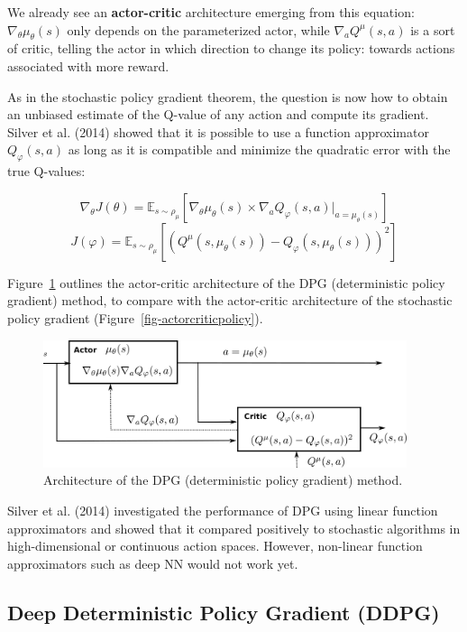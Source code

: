 \documentclass[
  letterpaper,
  DIV=11,
  numbers=noendperiod]{scrreprt}
\begin{document}
We already see an \textbf{actor-critic} architecture emerging from this
equation: \(\nabla_\theta \mu_\theta(s)\) only depends on the
parameterized actor, while \(\nabla_a Q^\mu(s, a)\) is a sort of critic,
telling the actor in which direction to change its policy: towards
actions associated with more reward.

As in the stochastic policy gradient theorem, the question is now how to
obtain an unbiased estimate of the Q-value of any action and compute its
gradient. Silver et al. (2014) showed that it is possible to use a
function approximator \(Q_\varphi(s, a)\) as long as it is compatible
and minimize the quadratic error with the true Q-values:

\[
    \nabla_\theta J(\theta) = \mathbb{E}_{s \sim \rho_\mu}[\nabla_\theta \mu_\theta(s) \times \nabla_a Q_\varphi(s, a) |_{a = \mu_\theta(s)}]
\] \[
    J(\varphi) = \mathbb{E}_{s \sim \rho_\mu}[(Q^\mu(s, \mu_\theta(s)) - Q_\varphi(s, \mu_\theta(s)))^2]
\]

Figure~\ref{fig-dpg} outlines the actor-critic architecture of the DPG
(deterministic policy gradient) method, to compare with the actor-critic
architecture of the stochastic policy gradient
(Figure~\ref{fig-actorcriticpolicy}).

\begin{figure}

{\centering \includegraphics[width=0.95\textwidth,height=\textheight]{./img/dpg.png}

}

\caption{\label{fig-dpg}Architecture of the DPG (deterministic policy
gradient) method.}

\end{figure}

Silver et al. (2014) investigated the performance of DPG using linear
function approximators and showed that it compared positively to
stochastic algorithms in high-dimensional or continuous action spaces.
However, non-linear function approximators such as deep NN would not
work yet.

\hypertarget{deep-deterministic-policy-gradient-ddpg}{%
\subsection{Deep Deterministic Policy Gradient
(DDPG)}\label{deep-deterministic-policy-gradient-ddpg}}
\end{document}

